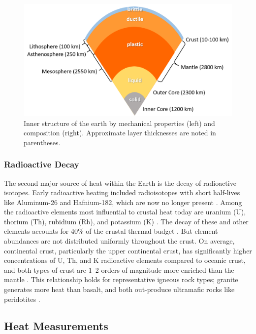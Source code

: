 \begin{figure}[!htp]
\centering
\includegraphics[width=.9\textwidth]{templates/images/Figure-Earth_structure.png}
\caption[Earth structure]{Inner structure of the earth by mechanical properties (left) and composition (right). Approximate layer thicknesses are noted in parentheses.}
\label{fig:earth_structure}
\end{figure}

\subsubsection{Radioactive Decay}\label{ch2:radio}
The second major source of heat within the Earth is the decay of radioactive isotopes. Early radioactive heating included radioisotopes with short half-lives like Aluminum-26 and Hafnium-182, which are now no longer present \citep[p.\ 16]{glassley_geothermal_2015}. Among the radioactive elements most influential to crustal heat  today are uranium (U), thorium (Th), rubidium (Rb), and potassium (K) \citep[p.\ 17]{glassley_geothermal_2015}. The decay of these and other elements accounts for 40\% of the crustal thermal budget \citep{stein_heat_1995}. But element abundances are not distributed uniformly throughout the crust. On average, continental crust, particularly the upper continental crust, has significantly higher concentrations of U, Th, and K radioactive elements compared to oceanic crust, and both types of crust are 1--2 orders of magnitude more enriched than the mantle \citep[p.\ 276]{fowler_solid_2005}. This relationship holds for representative igneous rock types; granite generates more heat than basalt, and both out-produce ultramafic rocks like peridotites \citep[p.\ 276]{fowler_solid_2005}.

\subsection{Heat Measurements}\label{ch2:heatmeas}
